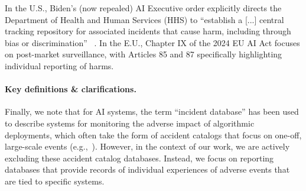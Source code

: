 In the U.S., Biden's (now repealed) AI Executive order explicitly directs the Department of Health and Human Services (HHS) to ``establish a [...]
central tracking repository for associated incidents that cause harm, including through bias or discrimination''
~\citep{biden2023executive}. In the E.U., Chapter IX of the 2024 EU AI Act focuses on post-market surveillance, with Articles 85 and 87 specifically highlighting individual reporting of harms.

\paragraph{Key definitions \& clarifications.}
Finally, we note that for AI systems, the term ``incident database'' has been used to describe systems for monitoring the adverse impact of algorithmic deployments, 
which often take the form of accident catalogs that focus on one-off, large-scale events (e.g.,~\citet{feffer2023ai,raji2022outsider,mcgregor2021preventing, ojewale2024towards, turri2023we}). 
However, in the context of our work, we are actively excluding these accident catalog databases. Instead, we focus on reporting databases that provide records of individual experiences of adverse events that are tied to specific systems. 